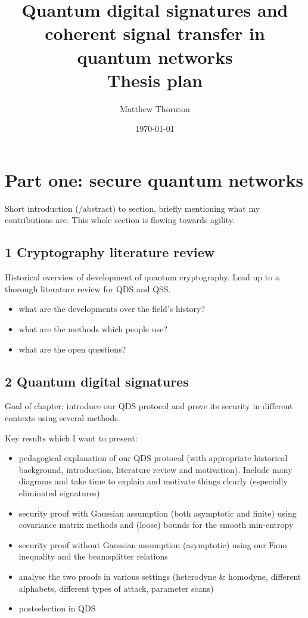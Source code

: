 \documentclass{article}
\title{Quantum digital signatures and coherent signal transfer in quantum networks \\ \vspace{0.2in}  \Large Thesis plan}
\author{Matthew Thornton}
\date{\today}
\begin{document}
\maketitle 

\section*{Part one: secure quantum networks}
Short introduction (/abstract) to section, briefly mentioning what my contributions are. This whole section is flowing towards agility.

\subsection*{1 Cryptography literature review}
Historical overview of development of quantum cryptography. Lead up to a thorough literature review for QDS and QSS.
\begin{itemize}
\item what are the developments over the field's history?
\item what are the methods which people use?
\item what are the open questions?
\end{itemize}

\subsection*{2 Quantum digital signatures}
Goal of chapter: introduce our QDS protocol and prove its security in different contexts using several methods.

Key results which I want to present:
\begin{itemize}
\item pedagogical explanation of our QDS protocol (with appropriate historical background, introduction, literature review and motivation). Include many diagrams and take time to explain and motivate things clearly (especially eliminated signatures)
\item security proof with Gaussian assumption (both asymptotic and finite) using covariance matrix methods and (loose) bounds for the smooth min-entropy
\item security proof without Gaussian assumption (asymptotic) using our Fano inequality and the beamsplitter relations
\item analyse the two proofs in various settings (heterodyne \& homodyne, different alphabets, different types of attack, parameter scans)
\item postselection in QDS
\end{itemize}
\end{document}
